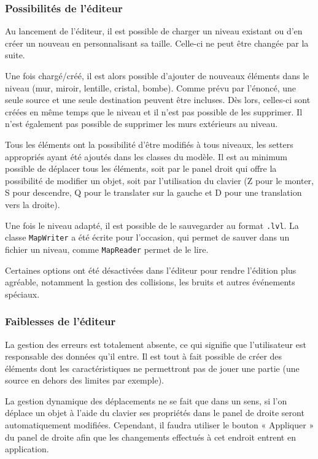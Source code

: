 \documentclass[]{article}
\begin{document}
\subsubsection{Possibilités de l’éditeur}

Au lancement de l’éditeur, il est possible de charger un niveau existant 
ou d’en créer un nouveau en personnalisant sa taille. Celle-ci ne peut 
être changée par la suite.

Une fois chargé/créé, il est alors possible d’ajouter de nouveaux éléments 
dans le niveau (mur, miroir, lentille, cristal, bombe). Comme prévu par l’énoncé,
une seule source et une seule destination peuvent être incluses. Dès lors, 
celles-ci sont créées en même temps que le niveau et il n’est pas possible de 
les supprimer. Il n'est également pas possible de supprimer les murs extérieurs
au niveau.

Tous les éléments ont la possibilité d’être modifiés à tous niveaux, les setters
appropriés ayant été ajoutés dans les classes du modèle. Il est au minimum possible de déplacer
tous les éléments, soit par le panel droit qui offre la possibilité de modifier
un objet, soit par l’utilisation du clavier (Z pour le monter, S pour descendre, Q pour le translater
sur la gauche et D pour une translation vers la droite).

Une fois le niveau adapté, il est possible de le sauvegarder au format \texttt{.lvl}. 
La classe \texttt{MapWriter} a été écrite pour l’occasion, qui permet de sauver 
dans un fichier un niveau, comme \texttt{MapReader} permet de le lire.

Certaines options ont été désactivées dans l’éditeur pour rendre l’édition plus agréable,
notamment la gestion des collisions, les bruits et autres événements spéciaux.

\subsubsection{Faiblesses de l’éditeur}

La gestion des erreurs est totalement absente, ce qui signifie que l’utilisateur est 
responsable des données qu’il entre. Il est tout à fait possible de créer des éléments
dont les caractéristiques ne permettront pas de jouer une partie (une source en dehors
des limites par exemple).

La gestion dynamique des déplacements ne se fait que dans un sens, si l’on déplace un objet
à l’aide du clavier ses propriétés dans le panel de droite seront automatiquement modifiées.
Cependant, il faudra utiliser le bouton « Appliquer » du panel de droite afin que les changements
effectués à cet endroit entrent en application.
\end{document}
